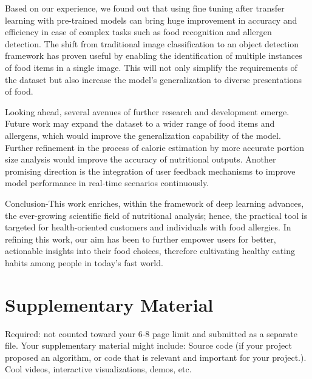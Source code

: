 \documentclass[10pt,twocolumn,letterpaper]{article}
\begin{document}
Based on our experience, we found out that using fine tuning after transfer learning with pre-trained models can bring huge improvement in accuracy and efficiency in case of complex tasks such as food recognition and allergen detection. 
The shift from traditional image classification to an object detection framework has proven useful by enabling the identification of multiple instances of food items in a single image. 
This will not only simplify the requirements of the dataset but also increase the model's generalization to diverse presentations of food.

Looking ahead, several avenues of further research and development emerge. 
Future work may expand the dataset to a wider range of food items and allergens, which would improve the generalization capability of the model. 
Further refinement in the process of calorie estimation by more accurate portion size analysis would improve the accuracy of nutritional outputs. 
Another promising direction is the integration of user feedback mechanisms to improve model performance in real-time scenarios continuously.

Conclusion-This work enriches, within the framework of deep learning advances, the ever-growing scientific field of nutritional analysis; hence, the practical tool is targeted for health-oriented customers and individuals with food allergies. 
In refining this work, our aim has been to further empower users for better, actionable insights into their food choices, therefore cultivating healthy eating habits among people in today's fast world.

\section{Supplementary Material}

Required: not counted toward your 6-8 page limit and submitted as a separate file. Your supplementary material might include:
Source code (if your project proposed an algorithm, or code that is relevant and important for your project.).
Cool videos, interactive visualizations, demos, etc.

{
    \small
    
    
}
\end{document}
